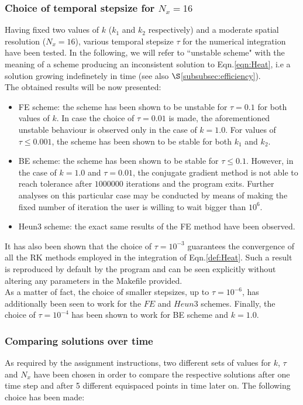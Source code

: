 \documentclass[11pt]{article}
\theoremstyle{theorem}
\theoremstyle{definition}
\begin{document}
\subsubsection{Choice of temporal stepsize for $N_x=16$}
Having fixed two values of $k$ ($k_1$ and $k_2$ respectively) and a moderate spatial resolution ($N_x=16$), various temporal stepsize $\tau$ for the numerical integration have been tested. In the following, we will refer to ``unstable scheme" with the meaning of a scheme producing an inconsistent solution to Eqn.\eqref{eqn:Heat}, i.e a solution growing indefinetely in time (see also $\S$\ref{subsubsec:efficiency}).\\ 
The obtained results will be now presented:
\begin{itemize}
	\label{itemize}
	\item FE scheme: the scheme has been shown to be unstable for $\tau=0.1$ for both values of $k$. In case the choice of $\tau=0.01$ is made, the aforementioned unstable behaviour is observed only in the case of $k=1.0$. For values of $\tau\le0.001$, the scheme has been shown to be stable for both $k_1$ and $k_2$.
	\item BE scheme: the scheme has been shown to be stable for $\tau\le0.1$. However, in the case of $k=1.0$ and $\tau=0.01$, the conjugate gradient method is not able to reach tolerance after $1000000$ iterations and the program exits. Further analyses on this particular case may be conducted by means of making the fixed number of iteration the user is willing to wait bigger than $10^6$. 
	\item Heun3 scheme: the exact same results of the FE method have been observed.
\end{itemize}

It has also been shown that the choice of $\tau=10^{-3}$ guarantees the convergence of all the RK methods employed in the integration of Eqn.\ref{def:Heat}. Such a result is reproduced by default by the program and can be seen explicitly without altering any parameters in the Makefile provided.\\
As a matter of fact, the choice of smaller stepsizes, up to $\tau=10^{-6}$, has additionally been seen to work for the $FE$ and $Heun3$ schemes. Finally, the choice of $\tau=10^{-4}$ has been shown to work for BE scheme and $k=1.0$.\\ 

\subsubsection{Comparing solutions over time}
As required by the assignment instructions, two different sets of values for $k$, $\tau$ and $N_x$ have been chosen in order to compare the respective solutions after one time step and after 5 different equispaced points in time later on. The following choice has been made:
\end{document}
